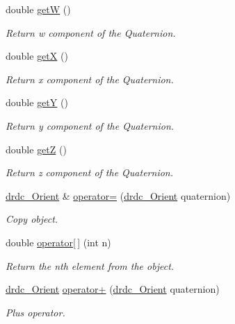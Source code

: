 \begin{CompactItemize}
double \hyperlink{classdrdc__Orient_008ad19db03958744df1fa439bdfe48d}{getW} ()
\begin{CompactList}\small\item\em Return w component of the Quaternion. \item\end{CompactList}\item 
double \hyperlink{classdrdc__Orient_5b811f266b864851414d64c14fe85b56}{getX} ()
\begin{CompactList}\small\item\em Return x component of the Quaternion. \item\end{CompactList}\item 
double \hyperlink{classdrdc__Orient_13857b4e5319328a2659463b9e526781}{getY} ()
\begin{CompactList}\small\item\em Return y component of the Quaternion. \item\end{CompactList}\item 
double \hyperlink{classdrdc__Orient_fbb0ef7390f7332228d43c71e610f546}{getZ} ()
\begin{CompactList}\small\item\em Return z component of the Quaternion. \item\end{CompactList}\item 
\hyperlink{classdrdc__Orient}{drdc\_\-Orient} \& \hyperlink{classdrdc__Orient_4e0336356d63d3c9011cd4f3c9894977}{operator=} (\hyperlink{classdrdc__Orient}{drdc\_\-Orient} quaternion)
\begin{CompactList}\small\item\em Copy object. \item\end{CompactList}\item 
double \hyperlink{classdrdc__Orient_39340efb40aebf2d8f18e99e0c7ad4a2}{operator\mbox{[}$\,$\mbox{]}} (int n)
\begin{CompactList}\small\item\em Return the nth element from the object. \item\end{CompactList}\item 
\hyperlink{classdrdc__Orient}{drdc\_\-Orient} \hyperlink{classdrdc__Orient_2a6baad21e9de394da4c951052e853a0}{operator+} (\hyperlink{classdrdc__Orient}{drdc\_\-Orient} quaternion)
\begin{CompactList}\small\item\em Plus operator. \item\end{CompactList}\item 

\end{CompactItemize}
